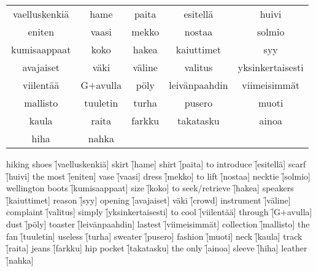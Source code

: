 \begin{center}
  \begin{tabular}{|c c c c c|}
    \hline
    vaelluskenkiä & hame & paita & esitellä & huivi \\
    eniten & vaasi & mekko & nostaa & solmio \\
    kumisaappaat & koko & hakea & kaiuttimet & syy \\
    avajaiset & väki & väline & valitus & yksinkertaisesti \\
    viilentää & G$+$avulla & pöly & leivänpaahdin & viimeisimmät \\
    mallisto & tuuletin & turha & pusero & muoti \\
    kaula & raita & farkku & takatasku & ainoa \\
    hiha & nahka &&& \\
    \hline
  \end{tabular}
\end{center}

\begin{questions}
  \begin{multicols}{3}
    \raggedcolumns
    \question hiking shoes \f[vaelluskenkiä]
    \question skirt        \f[hame]
    \question shirt        \f[paita]
    \question to introduce \f[esitellä]
    \question scarf        \f[huivi]
    \question the most     \f[eniten]
    \question vase         \f[vaasi]
    \question dress        \f[mekko]
    \question to lift      \f[nostaa]
    \question necktie      \f[solmio]
    \question wellington boots \f[kumisaappaat]
    \question size         \f[koko]
    \question to seek/retrieve \f[hakea]
    \question speakers         \f[kaiuttimet]
    \question reason           \f[syy]
    \question opening          \f[avajaiset]
    \question väki             \f[crowd]
    \question instrument       \f[väline]
    \question complaint        \f[valitus]
    \question simply           \f[yksinkertaisesti]
    \question to cool          \f[viilentää]
    \question through          \f[G$+$avulla]
    \question dust             \f[pöly]
    \question toaster          \f[leivänpaahdin]
    \question lastest          \f[viimeisimmät]
    \question collection       \f[mallisto]
    \question the fan          \f[tuuletin]
    \question useless          \f[turha]
    \question sweater          \f[pusero]
    \question fashion          \f[muoti]
    \question neck             \f[kaula]
    \question track            \f[raita]
    \question jeans            \f[farkku]
    \question hip pocket       \f[takatasku]
    \question the only         \f[ainoa]
    \question sleeve           \f[hiha]
    \question leather          \f[nahka]
  \end{multicols}
\end{questions}
